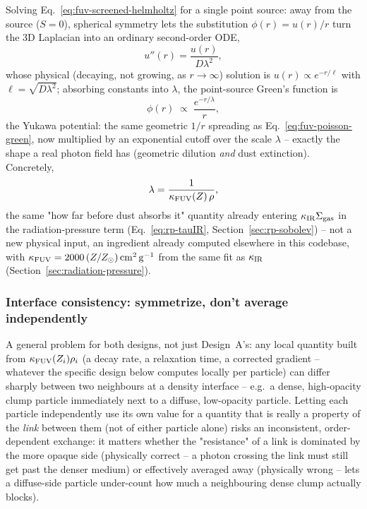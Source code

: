 Solving Eq.~\ref{eq:fuv-screened-helmholtz} for a single point source:
away from the source ($S=0$), spherical symmetry lets the substitution
$\phi(r)=u(r)/r$ turn the 3D Laplacian into an ordinary second-order
ODE,
\begin{equation}
  u''(r) = \frac{u(r)}{D\lambda^2},
  \label{eq:fuv-radial-ode}
\end{equation}
whose physical (decaying, not growing, as $r\to\infty$) solution is
$u(r)\propto e^{-r/\ell}$ with $\ell=\sqrt{D\lambda^2}$; absorbing
constants into $\lambda$, the point-source Green's function is
\begin{equation}
  \phi(r) \;\propto\; \frac{e^{-r/\lambda}}{r},
  \label{eq:fuv-yukawa-green}
\end{equation}
the Yukawa potential: the same geometric $1/r$ spreading as
Eq.~\ref{eq:fuv-poisson-green}, now multiplied by an exponential cutoff
over the scale $\lambda$ -- exactly the shape a real photon field has
(geometric dilution \emph{and} dust extinction). Concretely,
\begin{equation}
  \lambda = \frac{1}{\kappa_{\rm FUV}(Z)\,\rho} ,
  \label{eq:fuv-lambda-def}
\end{equation}
the same "how far before dust absorbs it" quantity already entering
$\kappa_{\rm IR}\Sigma_{\rm gas}$ in the radiation-pressure term
(Eq.~\ref{eq:rp-tauIR}, Section~\ref{sec:rp-sobolev}) -- not a new
physical input, an ingredient already computed elsewhere in this
codebase, with $\kappa_{\rm FUV}=2000\,(Z/Z_\odot)\,{\rm cm^2\,g^{-1}}$
from the same \citet{Hopkins2020} fit as $\kappa_{\rm IR}$
(Section~\ref{sec:radiation-pressure}).

\subsubsection{Interface consistency: symmetrize, don't average
independently}
\label{sec:fuv-harmonic-mean}

A general problem for both designs, not just Design~A's: any local
quantity built from $\kappa_{\rm FUV}(Z_i)\rho_i$ (a decay rate, a
relaxation time, a corrected gradient -- whatever the specific design
below computes locally per particle) can differ sharply between two
neighbours at a density interface -- e.g.\ a dense, high-opacity clump
particle immediately next to a diffuse, low-opacity particle. Letting
each particle independently use its own value for a quantity that is
really a property of the \emph{link} between them (not of either
particle alone) risks an inconsistent, order-dependent exchange: it
matters whether the "resistance" of a link is dominated by the more
opaque side (physically correct -- a photon crossing the link must
still get past the denser medium) or effectively averaged away
(physically wrong -- lets a diffuse-side particle under-count how much
a neighbouring dense clump actually blocks).

